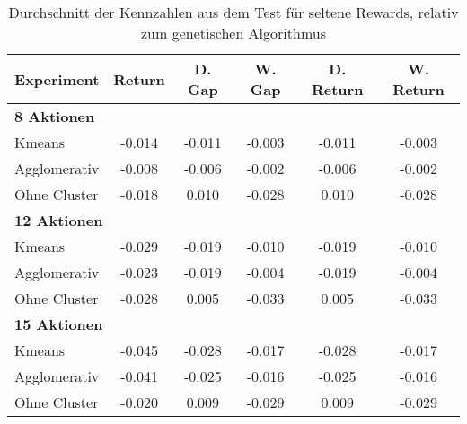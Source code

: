 \begin{table}[ht]
\centering
\caption{Durchschnitt der Kennzahlen aus dem Test für seltene Rewards, relativ zum genetischen Algorithmus}
\begin{tabular}{lccccc}
\hline
\textbf{Experiment} & \textbf{Return} & \textbf{D. Gap} & \textbf{W. Gap} & \textbf{D. Return} & \textbf{W. Return} \\
\hline
\multicolumn{6}{l}{\textbf{8 Aktionen}} \\
\hspace{1em}Kmeans & -0.014 & -0.011 & -0.003 & -0.011 & -0.003 \\
\hspace{1em}Agglomerativ & -0.008 & -0.006 & -0.002 & -0.006 & -0.002 \\
\hspace{1em}Ohne Cluster & -0.018 & 0.010 & -0.028 & 0.010 & -0.028 \\
\hline
\multicolumn{6}{l}{\textbf{12 Aktionen}} \\
\hspace{1em}Kmeans & -0.029 & -0.019 & -0.010 & -0.019 & -0.010 \\
\hspace{1em}Agglomerativ & -0.023 & -0.019 & -0.004 & -0.019 & -0.004 \\
\hspace{1em}Ohne Cluster & -0.028 & 0.005 & -0.033 & 0.005 & -0.033 \\
\hline
\multicolumn{6}{l}{\textbf{15 Aktionen}} \\
\hspace{1em}Kmeans & -0.045 & -0.028 & -0.017 & -0.028 & -0.017 \\
\hspace{1em}Agglomerativ & -0.041 & -0.025 & -0.016 & -0.025 & -0.016 \\
\hspace{1em}Ohne Cluster & -0.020 & 0.009 & -0.029 & 0.009 & -0.029 \\
\hline
\end{tabular}
\end{table}


